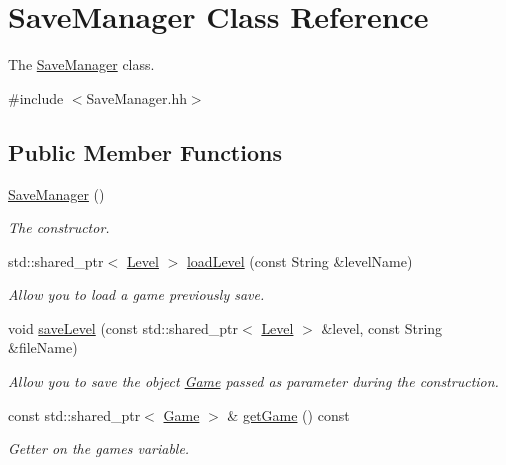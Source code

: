 \hypertarget{classSaveManager}{}\section{Save\+Manager Class Reference}
\label{classSaveManager}


The \hyperlink{classSaveManager}{Save\+Manager} class.  




{\ttfamily \#include $<$Save\+Manager.\+hh$>$}

\subsection*{Public Member Functions}
\begin{DoxyCompactItemize}
\item 
\mbox{\label{classSaveManager_ab8bb791be648b9b91db44aa11f6e8e14}} 
\hyperlink{classSaveManager_ab8bb791be648b9b91db44aa11f6e8e14}{Save\+Manager} ()
\begin{DoxyCompactList}\small\item\em The constructor. \end{DoxyCompactList}\item 
std\+::shared\+\_\+ptr$<$ \hyperlink{classLevel}{Level} $>$ \hyperlink{classSaveManager_aa0661d6a8f9c0330755a8e03f8631992}{load\+Level} (const String \&level\+Name)
\begin{DoxyCompactList}\small\item\em Allow you to load a game previously save. \end{DoxyCompactList}\item 
\mbox{\label{classSaveManager_a3fd6a2e996ee848bfec385a288f44461}} 
void \hyperlink{classSaveManager_a3fd6a2e996ee848bfec385a288f44461}{save\+Level} (const std\+::shared\+\_\+ptr$<$ \hyperlink{classLevel}{Level} $>$ \&level, const String \&file\+Name)
\begin{DoxyCompactList}\small\item\em Allow you to save the object \hyperlink{classGame}{Game} passed as parameter during the construction. \end{DoxyCompactList}\item 
\mbox{\label{classSaveManager_a94d97899e285c0bbd46f4fdb42767f79}} 
const std\+::shared\+\_\+ptr$<$ \hyperlink{classGame}{Game} $>$ \& \hyperlink{classSaveManager_a94d97899e285c0bbd46f4fdb42767f79}{get\+Game} () const
\begin{DoxyCompactList}\small\item\em Getter on the game\textquotesingle{}s variable. \end{DoxyCompactList}\end{DoxyCompactItemize}


